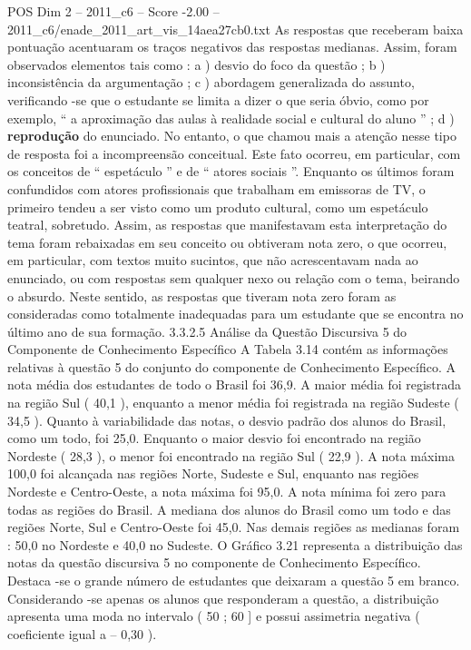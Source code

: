\begin{textsample}{POS Dim 2 – 2011\_c6 – Score -2.00 – 2011\_c6/enade\_2011\_art\_vis\_14aea27cb0.txt}
As respostas que receberam baixa pontuação acentuaram os traços negativos das respostas medianas.
Assim, foram observados elementos tais como : a ) desvio do foco da questão ; b ) inconsistência da argumentação ; c ) abordagem generalizada do assunto, verificando -se que o estudante se limita a dizer o que seria óbvio, como por exemplo, “ a aproximação das aulas à realidade social e cultural do aluno ” ; d ) \textbf{reprodução} do enunciado.
No entanto, o que chamou mais a atenção nesse tipo de resposta foi a incompreensão conceitual.
Este fato ocorreu, em particular, com os conceitos de “ espetáculo ” e de “ atores sociais ”.
Enquanto os últimos foram confundidos com atores profissionais que trabalham em emissoras de TV, o primeiro tendeu a ser visto como um produto cultural, como um espetáculo teatral, sobretudo.
Assim, as respostas que manifestavam esta interpretação do tema foram rebaixadas em seu conceito ou obtiveram nota zero, o que ocorreu, em particular, com textos muito sucintos, que não acrescentavam nada ao enunciado, ou com respostas sem qualquer nexo ou relação com o tema, beirando o absurdo.
Neste sentido, as respostas que tiveram nota zero foram as consideradas como totalmente inadequadas para um estudante que se encontra no último ano de sua formação. 3.3.2.5 Análise da Questão Discursiva 5 do Componente de Conhecimento Específico A Tabela 3.14 contém as informações relativas à questão 5 do conjunto do componente de Conhecimento Específico.
A nota média dos estudantes de todo o Brasil foi 36,9.
A maior média foi registrada na região Sul ( 40,1 ), enquanto a menor média foi registrada na região Sudeste ( 34,5 ).
Quanto à variabilidade das notas, o desvio padrão dos alunos do Brasil, como um todo, foi 25,0.
Enquanto o maior desvio foi encontrado na região Nordeste ( 28,3 ), o menor foi encontrado na região Sul ( 22,9 ).
A nota máxima 100,0 foi alcançada nas regiões Norte, Sudeste e Sul, enquanto nas regiões Nordeste e Centro-Oeste, a nota máxima foi 95,0.
A nota mínima foi zero para todas as regiões do Brasil.
A mediana dos alunos do Brasil como um todo e das regiões Norte, Sul e Centro-Oeste foi 45,0.
Nas demais regiões as medianas foram : 50,0 no Nordeste e 40,0 no Sudeste.
O Gráfico 3.21 representa a distribuição das notas da questão discursiva 5 no componente de Conhecimento Específico.
Destaca -se o grande número de estudantes que deixaram a questão 5 em branco.
Considerando -se apenas os alunos que responderam a questão, a distribuição apresenta uma moda no intervalo ( 50 ; 60 ] e possui assimetria negativa ( coeficiente igual a – 0,30 ).

\end{textsample}
